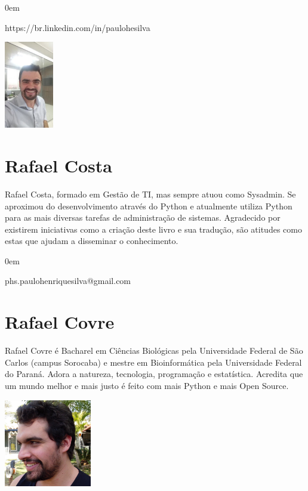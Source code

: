 \begin{description}
\itemsep0em 
\item[LinkedIn] https://br.linkedin.com/in/paulohesilva
\end{description}

\beforefig
\centerline{\includegraphics[height=1.50in]{translators/paulohesilva.eps}}
\afterfig

\newpage

\section*{Rafael Costa}

Rafael Costa, formado em Gestão de TI, mas sempre atuou como Sysadmin. Se aproximou do desenvolvimento através do Python e atualmente utiliza Python para as mais diversas tarefas de administração de sistemas. Agradecido por existirem iniciativas como a criação deste livro e sua tradução, são atitudes como estas que ajudam a disseminar o conhecimento.

\begin{description}
\itemsep0em 
\item[E-mail] phs.paulohenriquesilva@gmail.com
\end{description}

\section*{Rafael Covre}

Rafael Covre é Bacharel em Ciências Biológicas pela Universidade Federal de São Carlos (campus Sorocaba) e mestre em Bioinformática pela Universidade Federal do Paraná. Adora a natureza, tecnologia, programação e estatística. Acredita que um mundo melhor e mais justo é feito com mais Python e mais Open Source.

\beforefig
\centerline{\includegraphics[height=1.50in]{translators/rafaelcovre.eps}}
\afterfig

